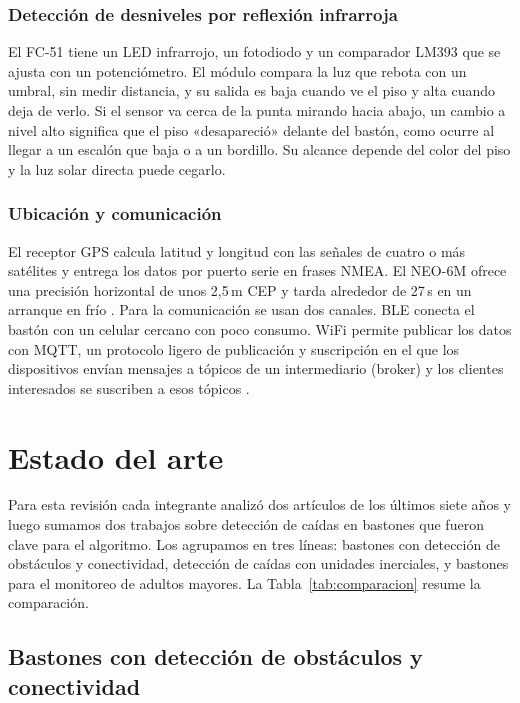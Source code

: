 \documentclass[conference,a4paper]{IEEEtran}
\begin{document}
\subsubsection{Detección de desniveles por reflexión infrarroja}
El FC-51 tiene un LED infrarrojo, un fotodiodo y un comparador LM393 que se ajusta con un potenciómetro. El módulo compara la luz que rebota con un umbral, sin medir distancia, y su salida es baja cuando ve el piso y alta cuando deja de verlo. Si el sensor va cerca de la punta mirando hacia abajo, un cambio a nivel alto significa que el piso «desapareció» delante del bastón, como ocurre al llegar a un escalón que baja o a un bordillo. Su alcance depende del color del piso y la luz solar directa puede cegarlo.

\subsubsection{Ubicación y comunicación}
El receptor GPS calcula latitud y longitud con las señales de cuatro o más satélites y entrega los datos por puerto serie en frases NMEA. El NEO-6M ofrece una precisión horizontal de unos 2,5\,m CEP y tarda alrededor de 27\,s en un arranque en frío \cite{neo6m}. Para la comunicación se usan dos canales. BLE conecta el bastón con un celular cercano con poco consumo. WiFi permite publicar los datos con MQTT, un protocolo ligero de publicación y suscripción en el que los dispositivos envían mensajes a tópicos de un intermediario (broker) y los clientes interesados se suscriben a esos tópicos \cite{mqtt}.

\section{Estado del arte}

Para esta revisión cada integrante analizó dos artículos de los últimos siete años y luego sumamos dos trabajos sobre detección de caídas en bastones que fueron clave para el algoritmo. Los agrupamos en tres líneas: bastones con detección de obstáculos y conectividad, detección de caídas con unidades inerciales, y bastones para el monitoreo de adultos mayores. La Tabla~\ref{tab:comparacion} resume la comparación.

\subsection{Bastones con detección de obstáculos y conectividad}
\end{document}
